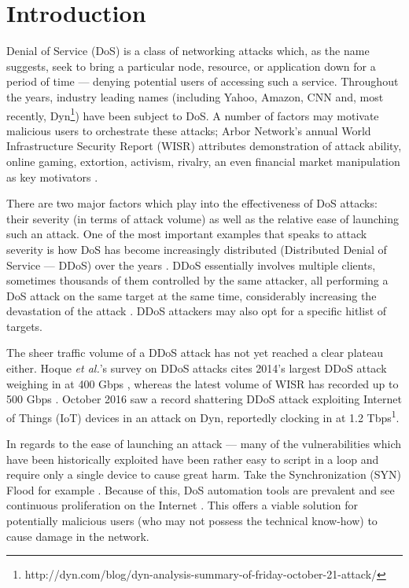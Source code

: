 \documentclass[conference]{IEEEtran}
\begin{document}
\section{Introduction}
Denial of Service (DoS) is a class of networking attacks which, as the name suggests, seek to bring a particular node, resource, or application down for a period of time --- denying potential users of accessing such a service. Throughout the years, industry leading names (including Yahoo, Amazon, CNN \cite{Bhuyan:partialRank} and, most recently, Dyn\footnote{http://dyn.com/blog/dyn-analysis-summary-of-friday-october-21-attack/}) have been subject to DoS. A number of factors may motivate malicious users to orchestrate these attacks; Arbor Network's annual World Infrastructure Security Report (WISR) attributes demonstration of attack ability, online gaming, extortion, activism, rivalry, an even financial market manipulation as key motivators \cite{Arbor:WISR}.

There are two major factors which play into the effectiveness of DoS attacks: their severity (in terms of attack volume) as well as the relative ease of launching such an attack. One of the most important examples that speaks to attack severity is how DoS has become increasingly distributed (Distributed Denial of Service --- DDoS) over the years \cite{DDoS:CERT}. DDoS essentially involves multiple clients, sometimes thousands of them controlled by the same attacker, all performing a DoS attack on the same target at the same time, considerably increasing the devastation of the attack \cite{Botnet:Hoque}. DDoS attackers may also opt for a specific hitlist of targets.

The sheer traffic volume of a DDoS attack has not yet reached a clear plateau either. Hoque \textit{et al.}'s survey on DDoS attacks cites 2014's largest DDoS attack weighing in at 400 Gbps \cite{Botnet:Hoque}, whereas the latest volume of WISR has recorded up to 500 Gbps \cite{Arbor:WISR}. October 2016 saw a record shattering DDoS attack exploiting Internet of Things (IoT) devices in an attack on Dyn, reportedly clocking in at 1.2 Tbps\textsuperscript{1}.

In regards to the ease of launching an attack --- many of the vulnerabilities which have been historically exploited have been rather easy to script in a loop and require only a single device to cause great harm. Take the Synchronization (SYN) Flood for example \cite{SecuringCloudServers:Chapade}. Because of this, DoS automation tools are prevalent and see continuous proliferation on the Internet \cite{Filtration:Kalkan}. This offers a viable solution for potentially malicious users (who may not possess the technical know-how) to cause damage in the network. 
\end{document}
